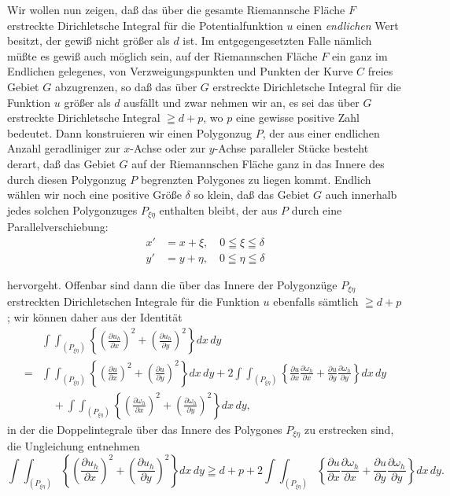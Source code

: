 \documentclass{article}
\begin{document}
Wir wollen nun zeigen, daß das über die gesamte Riemannsche Fläche $F$ erstreckte Dirichletsche Integral für die Potentialfunktion $u$ einen \emph{endlichen} Wert besitzt, der gewiß nicht größer als $d$ ist. Im entgegengesetzten Falle nämlich müßte es gewiß auch möglich sein, auf der Riemannschen Fläche $F$ ein ganz im Endlichen gelegenes, von Verzweigungspunkten und Punkten der Kurve $C$ freies Gebiet $G$ abzugrenzen, so daß das über $G$ erstreckte Dirichletsche Integral für die Funktion $u$ größer als $d$ ausfällt und zwar nehmen wir an, es sei das über $G$ erstreckte Dirichletsche Integral $\geqq d+p$, wo $p$ eine gewisse positive Zahl bedeutet. Dann konstruieren wir einen Polygonzug $P$, der aus einer endlichen Anzahl geradliniger zur $x$-Achse oder zur $y$-Achse paralleler Stücke besteht derart, daß das Gebiet $G$ auf der Riemannschen Fläche ganz in das Innere des durch diesen Polygonzug $P$ begrenzten Polygones zu liegen kommt. Endlich wählen wir noch eine positive Größe $\delta$ so klein, daß das Gebiet $G$ auch innerhalb jedes solchen Polygonzuges $P_{\xi\eta}$ enthalten bleibt, der aus $P$ durch eine Parallelverschiebung:
\[
\begin{aligned}
x' &= x + \xi, \quad 0 \leqq \xi \leqq \delta \\
y' &= y + \eta, \quad 0 \leqq \eta \leqq \delta
\end{aligned}
\]

hervorgeht. Offenbar sind dann die über das Innere der Polygonzüge $P_{\xi\eta}$ erstreckten Dirichletschen Integrale für die Funktion $u$ ebenfalls sämtlich $\geqq d+p$; wir können daher aus der Identität
\[
\begin{aligned}
&\int\!\!\int_{(P_{\xi\eta})} \left\{ \left(\frac{\partial u_h}{\partial x}\right)^2 + \left(\frac{\partial u_h}{\partial y}\right)^2 \right\} dx\,dy \\
= &\int\!\!\int_{(P_{\xi\eta})} \left\{ \left(\frac{\partial u}{\partial x}\right)^2 + \left(\frac{\partial u}{\partial y}\right)^2 \right\} dx\,dy + 2 \int\!\!\int_{(P_{\xi\eta})} \left\{ \frac{\partial u}{\partial x} \frac{\partial \omega_h}{\partial x} + \frac{\partial u}{\partial y} \frac{\partial \omega_h}{\partial y} \right\} dx\,dy \\
&\quad + \int\!\!\int_{(P_{\xi\eta})} \left\{ \left(\frac{\partial \omega_h}{\partial x}\right)^2 + \left(\frac{\partial \omega_h}{\partial y}\right)^2 \right\} dx\,dy,
\end{aligned}
\]
in der die Doppelintegrale über das Innere des Polygones $P_{\xi\eta}$ zu erstrecken sind, die Ungleichung entnehmen
\[
\int\!\!\int_{(P_{\xi\eta})} \left\{ \left(\frac{\partial u_h}{\partial x}\right)^2 + \left(\frac{\partial u_h}{\partial y}\right)^2 \right\} dx\,dy \geqq d + p + 2 \int\!\!\int_{(P_{\xi\eta})} \left\{ \frac{\partial u}{\partial x} \frac{\partial \omega_h}{\partial x} + \frac{\partial u}{\partial y} \frac{\partial \omega_h}{\partial y} \right\} dx\,dy.
\]
\end{document}
